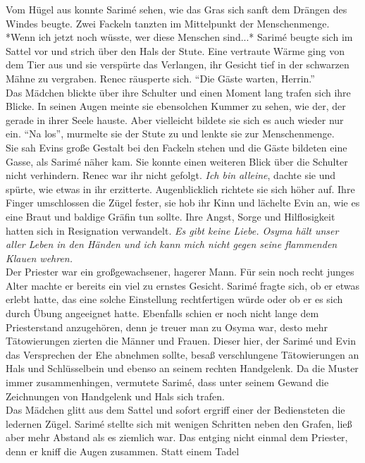Vom Hügel aus konnte Sarimé sehen, wie das Gras sich sanft dem Drängen des Windes beugte. Zwei 
Fackeln tanzten im Mittelpunkt der Menschenmenge. 
*Wenn ich jetzt noch wüsste, wer diese Menschen sind...*
Sarimé beugte sich im Sattel vor und strich über den Hals der Stute. Eine vertraute Wärme ging von 
dem Tier aus und sie verspürte das Verlangen, ihr Gesicht tief in der schwarzen Mähne zu vergraben.
Renec räusperte sich. ``Die Gäste warten, Herrin.''\\
Das Mädchen blickte über ihre Schulter und einen Moment lang trafen sich ihre Blicke. In seinen 
Augen meinte sie ebensolchen Kummer zu sehen, wie der, der gerade in ihrer Seele hauste. Aber 
vielleicht bildete sie sich es auch wieder nur ein. ``Na los'', murmelte sie der Stute zu und 
lenkte sie zur Menschenmenge.\\
Sie sah Evins große Gestalt bei den Fackeln stehen und die Gäste bildeten eine Gasse, als Sarimé 
näher kam. Sie konnte einen weiteren Blick über die Schulter nicht verhindern. Renec war ihr nicht 
gefolgt. \textit{Ich bin alleine}, dachte sie und spürte, wie etwas in ihr erzitterte. 
Augenblicklich richtete sie sich höher auf. Ihre Finger umschlossen die Zügel fester, sie hob ihr 
Kinn und lächelte Evin an, wie es eine Braut und baldige Gräfin tun sollte. Ihre Angst, Sorge und 
Hilflosigkeit hatten sich in Resignation verwandelt. \textit{Es gibt keine Liebe. Osyma hält unser 
aller Leben in den Händen und ich kann mich nicht gegen seine flammenden Klauen wehren.}\\
Der Priester war ein großgewachsener, hagerer Mann. Für sein noch recht junges Alter machte er 
bereits ein viel zu ernstes Gesicht. Sarimé fragte sich, ob er etwas erlebt hatte, das eine solche 
Einstellung rechtfertigen würde oder ob er es sich durch Übung angeeignet hatte. Ebenfalls schien 
er noch nicht lange dem Priesterstand anzugehören, denn je treuer man zu Osyma war, desto mehr 
Tätowierungen zierten die Männer und Frauen. Dieser hier, der Sarimé und Evin das Versprechen der 
Ehe abnehmen sollte, besaß verschlungene Tätowierungen an Hals und Schlüsselbein und ebenso an 
seinem rechten Handgelenk. Da die Muster immer zusammenhingen, vermutete Sarimé, dass unter seinem 
Gewand die Zeichnungen von Handgelenk und Hals sich trafen.\\ 
Das Mädchen glitt aus dem Sattel und sofort ergriff einer der Bediensteten die ledernen Zügel. 
Sarimé stellte sich mit wenigen Schritten neben den Grafen, ließ aber mehr Abstand als es ziemlich 
war. Das entging nicht einmal dem Priester, denn er kniff die Augen zusammen. Statt einem Tadel 
